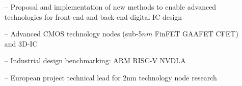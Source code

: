 \documentclass[10pt,a4paper,fancychapters]{altacv}
\begin{document}
\medskip


\medskip






\begin{itemize}
    \setlength{\itemindent}{0.5em}
    \item[--] \small{Proposal and implementation of new methods to enable advanced technologies for front-end and back-end digital IC design}
    \item[--] \small{Advanced CMOS technology nodes (sub-5$nm$ FinFET \textbullet\hspace{0.1em} GAAFET
    \textbullet\hspace{0.1em} CFET) and 3D-IC}
    \item[--] \small{Industrial design benchmarking: ARM \textbullet\hspace{0.1em} RISC-V \textbullet\hspace{0.1em} NVDLA}
    \item[--] \small{European project technical lead for 2nm technology node research}
\end{itemize}
\end{document}

